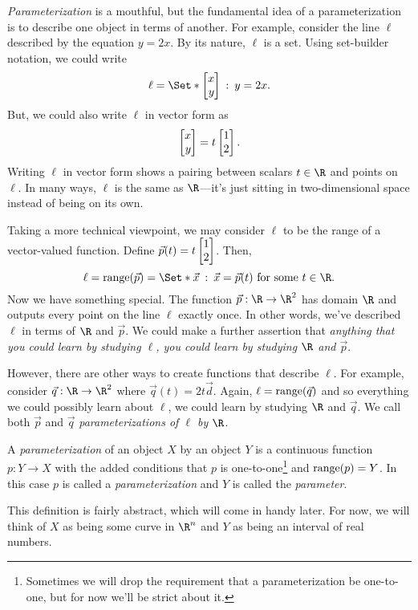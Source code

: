 \emph{Parameterization} is a mouthful, but the
fundamental idea of a parameterization is to describe one object in
terms of another.  For example, consider the line $\ell$ described
by the equation $y=2x$.  By its nature, $\ell$ is a set.
Using set-builder notation, we could write
\[
	\ell = \Set*{\mat{x\\y}\given y=2x}.
\]
But, we could also write $\ell$ in vector form as 
\[
	\mat{x\\y}=t\mat{1\\2}.
\]
Writing $\ell$ in vector form shows a pairing between scalars $t\in \R$
and points on $\ell$.  In many ways, $\ell$ is the same as $\R$---it's
just sitting in two-dimensional space instead of being on its own.

Taking a more technical viewpoint, we may consider $\ell$ to be the range of 
a vector-valued function.  Define $\vec p(t) = t\mat{1\\2}$.  Then,
\[
	\ell = \Range(\vec p) = \Set*{\vec x\given \vec x=\vec p(t)\text{ for some }t\in\R}.
\]
Now we have something special.  The function $\vec p:\R\to\R^2$ has domain $\R$ and outputs
every point on the line $\ell$ exactly once.  In other words, we've described
$\ell$ in terms of $\R$ and $\vec p$.  We could make a further assertion
that \emph{anything that you could learn by studying $\ell$, you could learn
by studying $\R$ and $\vec p$}.

However, there are other ways to create functions that describe $\ell$.
For example, consider $\vec q:\R\to\R^2$ where $\vec q(t)=2t\vec d$.  Again,
$\ell = \operatorname{range}(\vec q)$ and so everything we could possibly learn about
$\ell$, we could learn by studying $\R$ and $\vec q$.
We call both $\vec p$ and $\vec q$ \emph{parameterizations of $\ell$ by $\R$}.

\begin{definition}[Parameterization]
	A \emph{parameterization} of an object $X$ by an object $Y$ is a continuous
	function $p:Y\to X$ with the added conditions that $p$ is one-to-one\footnote{
	Sometimes we will drop the requirement that a parameterization be one-to-one,
	but for now we'll be strict about it.}
	and $\operatorname{range}(p)= Y$.  In this case $p$ is called a \emph{parameterization} and $Y$ is
	called the \emph{parameter}.
\end{definition}

This definition is fairly abstract, which will come in handy later. For
now, we will think of $X$ as being some curve in $\R^n$ and $Y$ as being an
interval of real numbers.

